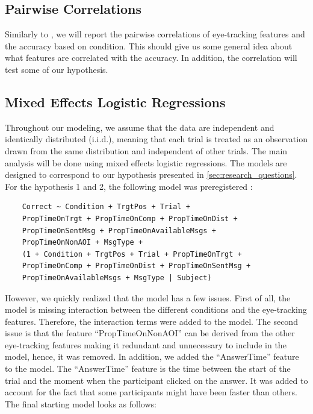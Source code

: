 \subsection{Pairwise Correlations}
\label{sec:analysis:corr}
Similarly to \cite{Vigneau_2006}, we will report the pairwise correlations of eye-tracking features and the accuracy based on condition. This should give us some general idea about what features are correlated with the accuracy. In addition, the correlation will test some of our hypothesis.

\subsection{Mixed Effects Logistic Regressions}
\label{sec:analysis:mixed_effects}

Throughout our modeling, we assume that the data are independent and identically distributed (i.i.d.), meaning that each trial is treated as an observation drawn from the same distribution and independent of other trials. The main analysis will be done using mixed effects logistic regressions. The models are designed to correspond to our hypothesis presented in \autoref{sec:research_questions}. For the hypothesis 1 and 2, the following model was preregistered \citep{preregistration}:
\begin{verbatim}
    Correct ~ Condition + TrgtPos + Trial + 
    PropTimeOnTrgt + PropTimeOnComp + PropTimeOnDist + 
    PropTimeOnSentMsg + PropTimeOnAvailableMsgs + 
    PropTimeOnNonAOI + MsgType +
    (1 + Condition + TrgtPos + Trial + PropTimeOnTrgt + 
    PropTimeOnComp + PropTimeOnDist + PropTimeOnSentMsg + 
    PropTimeOnAvailableMsgs + MsgType | Subject)
\end{verbatim}

However, we quickly realized that the model has a few issues. First of all, the model is missing interaction between the different conditions and the eye-tracking features. Therefore, the interaction terms were added to the model. The second issue is that the feature ``PropTimeOnNonAOI'' can be derived from the other eye-tracking features making it redundant and unnecessary to include in the model, hence, it was removed. In addition, we added the ``AnswerTime'' feature to the model. The ``AnswerTime'' feature is the time between the start of the trial and the moment when the participant clicked on the answer. It was added to account for the fact that some participants might have been faster than others. The final starting model looks as follows:

